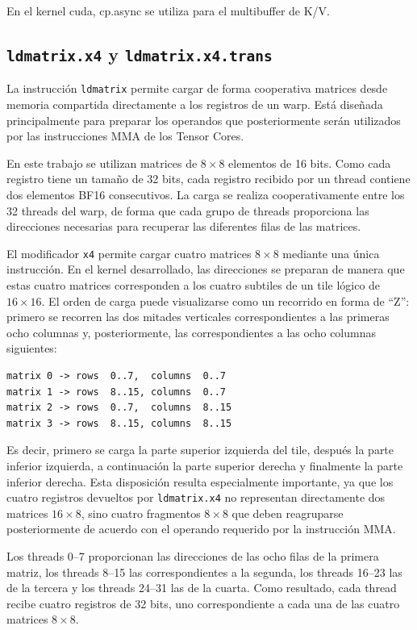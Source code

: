 En el kernel cuda, cp.async se utiliza para el multibuffer de K/V.

\subsection{\texttt{ldmatrix.x4} y \texttt{ldmatrix.x4.trans}}

La instrucción \texttt{ldmatrix} permite cargar de forma cooperativa matrices desde memoria compartida directamente a los registros de un warp. Está diseñada principalmente para preparar los operandos que posteriormente serán utilizados por las instrucciones MMA de los Tensor Cores.

En este trabajo se utilizan matrices de \(8\times8\) elementos de 16 bits. Como cada registro tiene un tamaño de 32 bits, cada registro recibido por un thread contiene dos elementos BF16 consecutivos. La carga se realiza cooperativamente entre los 32 threads del warp, de forma que cada grupo de threads proporciona las direcciones necesarias para recuperar las diferentes filas de las matrices.

El modificador \texttt{x4} permite cargar cuatro matrices \(8\times8\) mediante una única instrucción. En el kernel desarrollado, las direcciones se preparan de manera que estas cuatro matrices corresponden a los cuatro subtiles de un tile lógico de \(16\times16\). El orden de carga puede visualizarse como un recorrido en forma de ``Z'': primero se recorren las dos mitades verticales correspondientes a las primeras ocho columnas y, posteriormente, las correspondientes a las ocho columnas siguientes:

\begin{verbatim}
matrix 0 -> rows  0..7,  columns  0..7
matrix 1 -> rows  8..15, columns  0..7
matrix 2 -> rows  0..7,  columns  8..15
matrix 3 -> rows  8..15, columns  8..15
\end{verbatim}

Es decir, primero se carga la parte superior izquierda del tile, después la parte inferior izquierda, a continuación la parte superior derecha y finalmente la parte inferior derecha. Esta disposición resulta especialmente importante, ya que los cuatro registros devueltos por \texttt{ldmatrix.x4} no representan directamente dos matrices \(16\times8\), sino cuatro fragmentos \(8\times8\) que deben reagruparse posteriormente de acuerdo con el operando requerido por la instrucción MMA.

Los threads 0--7 proporcionan las direcciones de las ocho filas de la primera matriz, los threads 8--15 las correspondientes a la segunda, los threads 16--23 las de la tercera y los threads 24--31 las de la cuarta. Como resultado, cada thread recibe cuatro registros de 32 bits, uno correspondiente a cada una de las cuatro matrices \(8\times8\).


